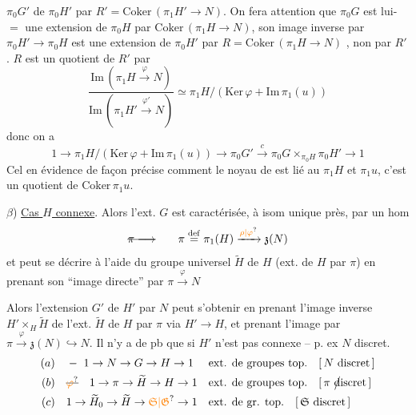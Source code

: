 $\pi_0G'$ de $\pi_0H'$ par $R'=\mathrm{Coker}\,(\pi_1 H'\to N)$. On fera \unsure{$\cdot$} attention que $\pi_0G$ est lui-$=$ une extension de  $\pi_0H$ par $\mathrm{Coker}\,(\pi_1H\to N)$, son image inverse  par $\pi_0 H'\to\pi_0H$ est une extension de $\pi_0H'$ par $R=\mathrm{Coker}\,(\pi_1 H\to N)$ , non par $R'$. $R$ est un quotient de $R'$ par
\[
\frac{\mathrm{Im}\,(\pi_1 H\xrightarrow{\varphi}N)}
     {\mathrm{Im}\,(\pi_1 H'\xrightarrow{\varphi'}N)}
\simeq \pi_1H/(\mathrm{Ker}\,\varphi+\mathrm{Im}\,\pi_1(u))
\]
donc on a
\[
1\to\pi_1H/(\mathrm{Ker}\,\varphi+\mathrm{Im}\,\pi_1(u))\to\pi_0G'
\xrightarrow{c}\pi_0G\times_{\pi_0H}\pi_0H'\to1
\]
Cel   en évidence de façon précise comment le noyau de  est lié au $\pi_1H$ et $\pi_1u$, c'est un quotient de $\mathrm{Coker}\,\pi_1u$.

$\beta$) \uline{Cas $H$ connexe}. Alors l'ext. $G$ est caractérisée, à isom unique près, par un hom
\[
\deleted{\pi\longrightarrow}\qquad
\pi\overset{\mathrm{def}}{=}\pi_1(H)\xrightarrow{\unsure{\rho|\varphi}}\mathfrak z(N)
\]
et peut se décrire à l'aide du groupe  universel $\widetilde H$ de $H$ (ext. de $H$ par $\pi$) en prenant son ``image directe'' par $\pi\xrightarrow{\varphi}N$

Alors l'extension  $G'$ de $H'$ par $N$ peut s'obtenir en prenant l'image inverse $H'\times_H\widetilde H$ de l'ext. $\widetilde H$ de $H$ par $\pi$ via $H'\to H$, et prenant l'image par $\pi\xrightarrow{\varphi}\mathfrak z(N)\hookrightarrow N$. Il n'y a de pb que si $H'$  n'est pas connexe  -- p. ex $N$ discret.  
\[
\begin{aligned}
(a)&\quad -\ 1\to N\to G\to H\to1
 &&\text{ext. de groupes top.}\quad [\,N\text{ discret}\,]\\
(b)&\quad \deleted{\unsure{\varphi}}\quad 1\to\pi\to\widetilde H\to H\to1
 &&\text{ext. de groupes top.}\quad [\,\pi\text{ \rlap{\(\big/\)}discret}\,]\\
(c)&\quad 1\to\widetilde H_0\to\widetilde H\to\unsure{\mathfrak S|\mathfrak G}\to1
 &&\text{ext. de gr. top.}\quad [\,\mathfrak S\text{ discret}\,]
\end{aligned}
\]

